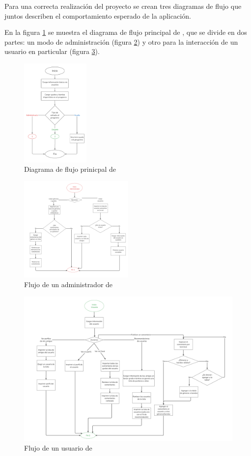Para una correcta realización del proyecto se crean tres diagramas de flujo que juntos describen el comportamiento esperado de la aplicación.

En la figura \ref{fig:diagrama2} se muestra el diagrama de flujo principal de \loopweb, que se divide en dos partes: un modo de administración (figura \ref{fig:diagrama3}) y otro para la interacción de un usuario en particular (figura \ref{fig:diagrama4}).
\begin{figure}[!h]
    \centering
    \includegraphics[width=0.3\textwidth]{./src/images/Diagrama2.png}
    \caption{Diagrama de flujo prinicpal de \loopweb}
    \label{fig:diagrama2}
\end{figure}

\begin{figure}[!h]
    \centering
    \includegraphics[width=0.5\textwidth]{./src/images/Diagrama3.png}
    \caption{Flujo de un administrador de \loopweb}
    \label{fig:diagrama3}
\end{figure}

\begin{figure}[p]
    \centering
    \includegraphics[width=1\textwidth]{./src/images/Diagrama4.png}
    \caption{Flujo de un usuario de \loopweb}
    \label{fig:diagrama4}
\end{figure}

